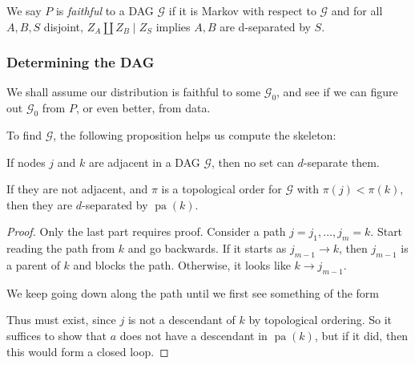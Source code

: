 \documentclass[a4paper]{article}
\DeclareMathOperator\pa{pa}
\begin{document}
\begin{defi}[Faithfulness]
  We say $P$ is \emph{faithful} to a DAG $\mathcal{G}$ if it is Markov with respect to $\mathcal{G}$ and for all $A, B, S$ disjoint, $Z_A \amalg Z_B \mid Z_S$ implies $A, B$ are d-separated by $S$.
\end{defi}

\subsubsection*{Determining the DAG}
We shall assume our distribution is faithful to some $\mathcal{G}_0$, and see if we can figure out $\mathcal{G}_0$ from $P$, or even better, from data.

To find $\mathcal{G}$, the following proposition helps us compute the skeleton:
\begin{prop}
  If nodes $j$ and $k$ are adjacent in a DAG $\mathcal{G}$, then no set can $d$-separate them.

  If they are not adjacent, and $\pi$ is a topological order for $\mathcal{G}$ with $\pi(j) < \pi(k)$, then they are $d$-separated by $\pa(k)$.
\end{prop}

\begin{proof}
  Only the last part requires proof. Consider a path $j = j_1, \ldots, j_m = k$. Start reading the path from $k$ and go backwards. If it starts as $j_{m - 1} \to k$, then $j_{m - 1}$ is a parent of $k$ and blocks the path. Otherwise, it looks like $k \to j_{m - 1}$.

  We keep going down along the path until we first see something of the form
  \begin{center}
  \end{center}
  Thus must exist, since $j$ is not a descendant of $k$ by topological ordering. So it suffices to show that $a$ does not have a descendant in $\pa(k)$, but if it did, then this would form a closed loop.
\end{proof}
\end{document}
